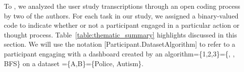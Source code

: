 To , we analyzed the user study transcriptions through an open coding process~\cite{Muller1993} by two of the authors. For each task in our study, we assigned a binary-valued code to indicate whether or not a participant engaged in a particular action or thought process. Table~\ref{table:thematic_summary} highlights  discussed in this section. We will use the notation [Participant.DatasetAlgorithm] to refer to a participant engaging with a dashboard created by an algorithm=\{1,2,3\}=\{\system, \cluster, \textsc{BFS}\} on a dataset =\{A,B\}=\{Police, Autism\}.
